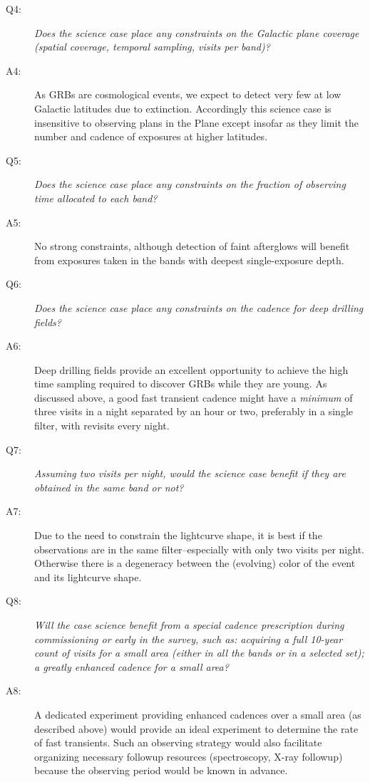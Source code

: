 \begin{description}
\item[Q4:] {\it Does the science case place any constraints on the
Galactic plane coverage (spatial coverage, temporal sampling, visits per
band)?}

\item[A4:] As GRBs are cosmological events, we expect to detect very few at
	low Galactic latitudes due to extinction.  Accordingly this
		science case is insensitive to observing plans in the Plane
		except insofar as they limit the number and cadence of
		exposures at higher latitudes.

\item[Q5:] {\it Does the science case place any constraints on the
fraction of observing time allocated to each band?}

\item[A5:] No strong constraints, although detection of faint afterglows
	will benefit from exposures taken in the bands with deepest
		single-exposure depth.

\item[Q6:] {\it Does the science case place any constraints on the
cadence for deep drilling fields?}

\item[A6:] Deep drilling fields provide an excellent opportunity to achieve
	the high time sampling required to discover GRBs while they are
		young.  As discussed above, a good fast transient cadence
		might have a \textit{minimum} of three visits
		in a night separated by an hour or two, preferably in a
		single filter, with revisits every night.

\item[Q7:] {\it Assuming two visits per night, would the science case
benefit if they are obtained in the same band or not?}

\item[A7:] Due to the need to constrain the lightcurve shape, it is best if
	the observations are in the same filter--especially with only two
	visits per night.  Otherwise there is a degeneracy between the
	(evolving) color of the event and its lightcurve shape.

\item[Q8:] {\it Will the case science benefit from a special cadence
prescription during commissioning or early in the survey, such as:
acquiring a full 10-year count of visits for a small area (either in all
the bands or in a  selected set); a greatly enhanced cadence for a small
area?}

\item[A8:] A dedicated experiment providing enhanced cadences over a small
	area  (as described above) would provide an ideal
	experiment to determine the rate of fast transients.  Such an
	observing strategy would also
	facilitate organizing necessary followup resources
	(spectroscopy, X-ray followup) because the observing period would
	be known in advance.


\end{description}

